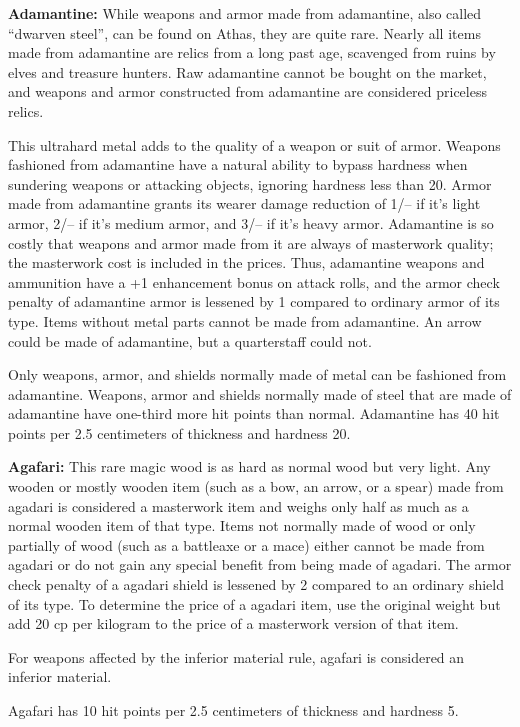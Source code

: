 \textbf{Adamantine:} While weapons and armor made from adamantine, also called ``dwarven steel'', can be found on Athas, they are quite rare. Nearly all items made from adamantine are relics from a long past age, scavenged from ruins by elves and treasure hunters. Raw adamantine cannot be bought on the market, and weapons and armor constructed from adamantine are considered priceless relics.

This ultrahard metal adds to the quality of a weapon or suit of armor. Weapons fashioned from adamantine have a natural ability to bypass hardness when sundering weapons or attacking objects, ignoring hardness less than 20. Armor made from adamantine grants its wearer damage reduction of 1/-- if it's light armor, 2/-- if it's medium armor, and 3/-- if it's heavy armor. Adamantine is so costly that weapons and armor made from it are always of masterwork quality; the masterwork cost is included in the prices. Thus, adamantine weapons and ammunition have a +1 enhancement bonus on attack rolls, and the armor check penalty of adamantine armor is lessened by 1 compared to ordinary armor of its type. Items without metal parts cannot be made from adamantine. An arrow could be made of adamantine, but a quarterstaff could not.

Only weapons, armor, and shields normally made of metal can be fashioned from adamantine. Weapons, armor and shields normally made of steel that are made of adamantine have one-third more hit points than normal. Adamantine has 40 hit points per 2.5 centimeters of thickness and hardness 20.

\textbf{Agafari:} This rare magic wood is as hard as normal wood but very light. Any wooden or mostly wooden item (such as a bow, an arrow, or a spear) made from agadari is considered a masterwork item and weighs only half as much as a normal wooden item of that type. Items not normally made of wood or only partially of wood (such as a battleaxe or a mace) either cannot be made from agadari or do not gain any special benefit from being made of agadari. The armor check penalty of a agadari shield is lessened by 2 compared to an ordinary shield of its type. To determine the price of a agadari item, use the original weight but add 20 cp per kilogram to the price of a masterwork version of that item.

For weapons affected by the inferior material rule, agafari is considered an inferior material.

Agafari has 10 hit points per 2.5 centimeters of thickness and hardness 5.


